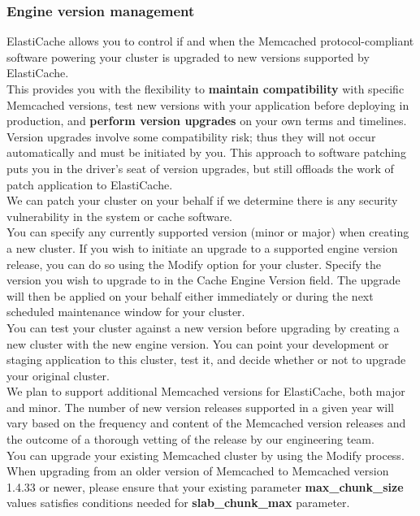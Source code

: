 \documentclass[12pt, letterpaper, twoside]{article}
\begin{document}
\subsubsection{Engine version management}
ElastiCache allows you to control if and when the Memcached protocol-compliant software powering your cluster is upgraded to 
new versions supported by ElastiCache.\\
This provides you with the flexibility to \textbf{maintain compatibility} with specific Memcached versions, test new versions with your 
application before deploying in production, and \textbf{perform version upgrades} on your own terms and timelines.\\
Version upgrades involve some compatibility risk; thus they will not occur automatically and must be initiated by you. This 
approach to software patching puts you in the driver's seat of version upgrades, but still offloads the work of patch application
to ElastiCache.\\
We can patch your cluster on your behalf if we determine there is any security vulnerability in the system or cache software.\\

You can specify any currently supported version (minor or major) when creating a new cluster. If you wish to initiate an upgrade 
to a supported engine version release, you can do so using the Modify option for your cluster. Specify the version you wish to upgrade 
to in the Cache Engine Version field. The upgrade will then be applied on your behalf either immediately or during the next 
scheduled maintenance window for your cluster.\\

You can test your cluster against a new version before upgrading by creating a new cluster with the new engine version. You can 
point your development or staging application to this cluster, test it, and decide whether or not to upgrade your original cluster.\\

We plan to support additional Memcached versions for ElastiCache, both major and minor. The number of new version releases 
supported in a given year will vary based on the frequency and content of the Memcached version releases and the outcome of a 
thorough vetting of the release by our engineering team.\\

You can upgrade your existing Memcached cluster by using the Modify process. When upgrading from an older version of Memcached 
to Memcached version 1.4.33 or newer, please ensure that your existing parameter \textbf{max\_chunk\_size} values satisfies 
conditions needed for \textbf{slab\_chunk\_max} parameter.
\end{document}
